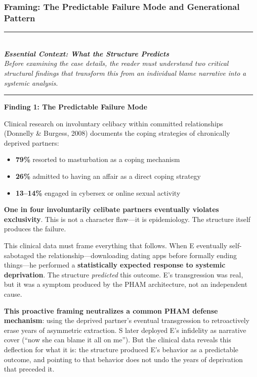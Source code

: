 \documentclass[12pt, letterpaper]{article}
\begin{document}
\subsubsection{Framing: The Predictable Failure Mode and Generational Pattern}

\begin{center}
\rule{0.6\textwidth}{0.4pt}\\[0.5em]
\textit{\textbf{Essential Context: What the Structure Predicts}}\\[0.3em]
\textit{Before examining the case details, the reader must understand two critical structural findings that transform this from an individual blame narrative into a systemic analysis.}\\[0.5em]
\rule{0.6\textwidth}{0.4pt}
\end{center}

\textbf{Finding 1: The Predictable Failure Mode}

Clinical research on involuntary celibacy within committed relationships (Donnelly \& Burgess, 2008) documents the coping strategies of chronically deprived partners:

\begin{itemize}
    \item \textbf{79\%} resorted to masturbation as a coping mechanism
    \item \textbf{26\%} admitted to having an affair as a direct coping strategy
    \item \textbf{13--14\%} engaged in cybersex or online sexual activity
\end{itemize}

\textbf{One in four involuntarily celibate partners eventually violates exclusivity}. This is not a character flaw---it is epidemiology. The structure itself produces the failure.

This clinical data must frame everything that follows. When E eventually self-sabotaged the relationship---downloading dating apps before formally ending things---he performed a \textbf{statistically expected response to systemic deprivation}. The structure \textit{predicted} this outcome. E's transgression was real, but it was a symptom produced by the PHAM architecture, not an independent cause.

\textbf{This proactive framing neutralizes a common PHAM defense mechanism}: using the deprived partner's eventual transgression to retroactively erase years of asymmetric extraction. S later deployed E's infidelity as narrative cover (``now she can blame it all on me''). But the clinical data reveals this deflection for what it is: the structure produced E's behavior as a predictable outcome, and pointing to that behavior does not undo the years of deprivation that preceded it.
\end{document}
